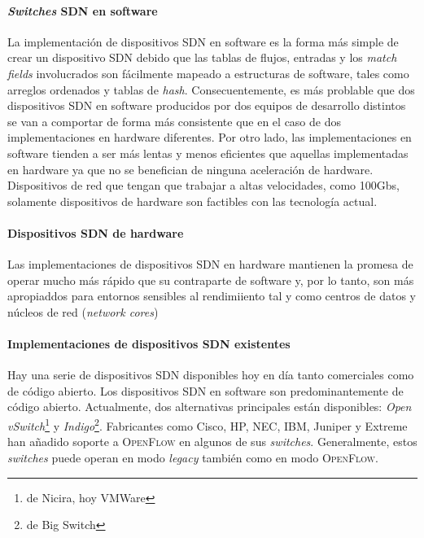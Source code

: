 \documentclass[10pt,journal,compsoc]{IEEEtran}
\begin{document}
\paragraph{\emph{Switches} SDN en software}
La implementación de dispositivos SDN en software es la forma más simple de crear un dispositivo SDN debido que las tablas de flujos, entradas y los \emph{match fields} involucrados son fácilmente mapeado a estructuras de software, tales como arreglos ordenados y tablas de \emph{hash}. Consecuentemente, es más problable que dos dispositivos SDN en software producidos por dos equipos de desarrollo distintos se van a comportar de forma más consistente que en el caso de dos implementaciones en hardware diferentes. Por otro lado, las implementaciones en software tienden a ser más lentas y menos eficientes que aquellas implementadas en hardware ya que no se benefician de ninguna aceleración de hardware. Dispositivos de red que tengan que trabajar a altas velocidades, como 100Gbs, solamente dispositivos de hardware son factibles con las tecnología actual.

\paragraph{Dispositivos SDN de hardware}
Las implementaciones de dispositivos SDN en hardware mantienen la promesa de operar mucho más rápido que su contraparte de software y, por lo tanto, son más apropiaddos para entornos sensibles al rendimiiento tal y como centros de datos y núcleos de red (\emph{network cores})

\paragraph{Implementaciones de dispositivos SDN existentes}
Hay una serie de dispositivos SDN disponibles hoy en día tanto comerciales como de código abierto. Los dispositivos SDN en software son predominantemente de código abierto. Actualmente, dos alternativas principales están disponibles: \emph{Open vSwitch}\footnote{de Nicira, hoy VMWare } y \emph{Indigo}\footnote{de Big Switch}. Fabricantes como Cisco, HP, NEC, IBM, Juniper y Extreme han añadido soporte a \textsc{OpenFlow} en algunos de sus \emph{switches}. Generalmente, estos \emph{switches} puede operan en modo \emph{legacy} también como en modo \textsc{OpenFlow}.
\end{document}
